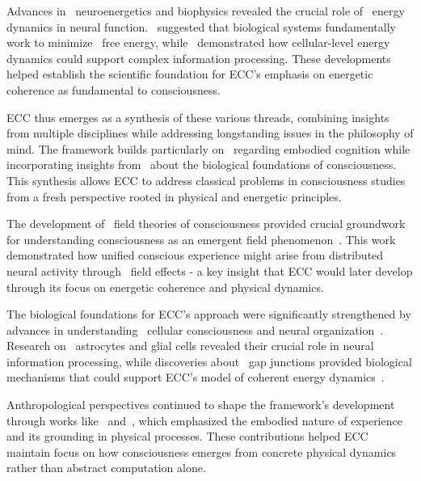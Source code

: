 Advances in~ neuroenergetics and biophysics revealed the crucial role of~ energy dynamics in neural function.~\cite{friston2010free} suggested that biological systems fundamentally work to minimize~ free energy, while~\cite{levin2019computational} demonstrated how cellular-level energy dynamics could support complex information processing. These developments helped establish the scientific foundation for ECC's emphasis on energetic coherence as fundamental to consciousness.

ECC thus emerges as a synthesis of these various threads, combining insights from multiple disciplines while addressing longstanding issues in the philosophy of mind. The framework builds particularly on~\cite{varela1991embodied} regarding embodied cognition while incorporating insights from~\cite{churchland1986neurophilosophy} about the biological foundations of consciousness. This synthesis allows ECC to address classical problems in consciousness studies from a fresh perspective rooted in physical and energetic principles.

The development of~ field theories of consciousness provided crucial groundwork for understanding consciousness as an emergent field phenomenon~\cite{hayles1999posthuman}. This work demonstrated how unified conscious experience might arise from distributed neural activity through~ field effects - a key insight that ECC would later develop through its focus on energetic coherence and physical dynamics.

The biological foundations for ECC's approach were significantly strengthened by advances in understanding~ cellular consciousness and neural organization~\cite{margulis2001conscious}. Research on~ astrocytes and glial cells revealed their crucial role in neural information processing, while discoveries about~ gap junctions provided biological mechanisms that could support ECC's model of coherent energy dynamics~\cite{magistretti2015cellular}.

Anthropological perspectives continued to shape the framework's development through works like~\cite{ingold2000perception} and~\cite{desjarlais1992body}, which emphasized the embodied nature of experience and its grounding in physical processes. These contributions helped ECC maintain focus on how consciousness emerges from concrete physical dynamics rather than abstract computation alone.

